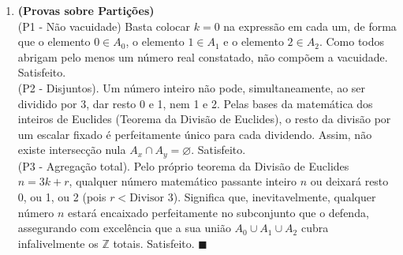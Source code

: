 \documentclass[12pt]{article}
\begin{document}
\begin{enumerate}
\vspace{0.3cm}
\item \textbf{(Provas sobre Partições)}\\
(P1 - Não vacuidade) Basta colocar $k=0$ na expressão em cada um, de forma que o elemento $0 \in A_0$, o elemento $1 \in A_1$ e o elemento $2 \in A_2$. Como todos abrigam pelo menos um número real constatado, não compõem a vacuidade. Satisfeito.\\
(P2 - Disjuntos). Um número inteiro não pode, simultaneamente, ao ser dividido por 3, dar resto 0 e 1, nem 1 e 2. Pelas bases da matemática dos inteiros de Euclides (Teorema da Divisão de Euclides), o resto da divisão por um escalar fixado é perfeitamente único para cada dividendo. Assim, não existe intersecção nula $A_x \cap A_y = \varnothing$. Satisfeito.\\
(P3 - Agregação total). Pelo próprio teorema da Divisão de Euclides $n = 3k + r$, qualquer número matemático passante inteiro $n$ ou deixará resto 0, ou 1, ou 2 (pois $r < \text{Divisor } 3$). Significa que, inevitavelmente, qualquer número $n$ estará encaixado perfeitamente no subconjunto que o defenda, assegurando com excelência que a sua união $A_0 \cup A_1 \cup A_2$ cubra infalivelmente os $\mathbb{Z}$ totais. Satisfeito. $\blacksquare$
\end{enumerate}
\end{document}
